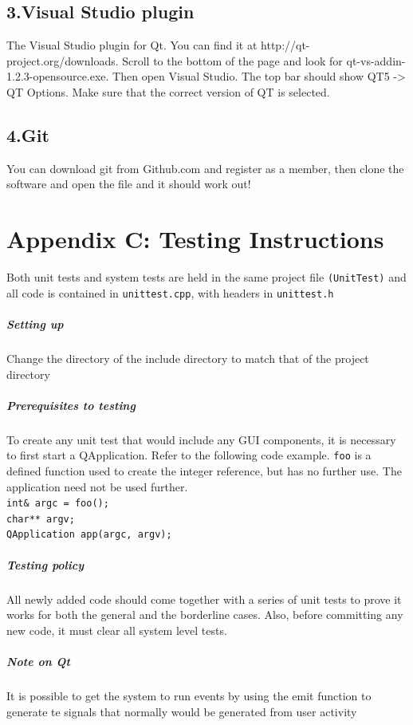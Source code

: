 \documentclass[12pt]{extarticle}
\begin{document}
\subsection{3.Visual Studio plugin}
The Visual Studio plugin for Qt. You can find it at http://qt-project.org/downloads. 
Scroll to the bottom of the page and look for qt-vs-addin-1.2.3-opensource.exe. 
Then open Visual Studio. The top bar should show QT5 -> QT Options. Make 
sure that the correct version of QT is selected. 
\subsection{4.Git}
You can download git from Github.com and register as a member, then clone the software and open the file and it should work out!

\section{Appendix C: Testing Instructions}
Both unit tests and system tests are held in the same project file \texttt{(UnitTest)} and all code is contained in \texttt{unittest.cpp}, with headers in \texttt{unittest.h}
\subparagraph{Setting up}
Change the directory of the include directory to match that of the project directory
\subparagraph{Prerequisites to testing}
To create any unit test that would include any GUI components, it is necessary to first start a QApplication. Refer to the following code example. \texttt{foo} is a defined function used to create the integer reference, but has no further use. The application need not be used further.\\
\texttt{int\& argc = foo();\\
char** argv;\\
QApplication app(argc, argv);
}
\subparagraph{Testing policy}
All newly added code should come together with a series of unit tests to prove it works for both the general and the borderline cases. Also, before committing any new code, it must clear all system level tests.

\subparagraph{Note on Qt}
It is possible to get the system to run events by using the emit function to generate te signals that normally would be generated from user activity

\newpage
\end{document}
